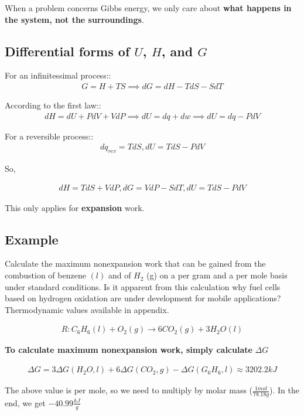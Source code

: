 \documentclass[12pt]{book}
\begin{document}
When a problem concerns Gibbs energy, we only care about \textbf{what happens in the system, not the surroundings}.

\subsection*{Differential forms of $U$, $H$, and $G$}
For an infinitessimal process::
\begin{align*}
    G=H+TS\implies dG=dH-TdS-SdT
\end{align*}

According to the first law::
\begin{align*}
    dH=dU+PdV+VdP\implies dU=dq+dw\implies dU=dq-PdV
\end{align*}

For a reversible process::
\begin{align*}
    dq_{rev}=TdS, dU=TdS-PdV
\end{align*}

So,

\begin{align*}
    dH=TdS+VdP,dG=VdP-SdT, dU=TdS-PdV
\end{align*}

This only applies for \textbf{expansion} work.

\subsection*{Example}

Calculate the maximum nonexpansion work that can be gained from the combustion of
benzene $(l)$ and of $H_2$ (g) on a per gram and a per mole basis under standard conditions. Is it
apparent from this calculation why fuel cells based on hydrogen oxidation are under
development for mobile applications? Thermodynamic values available in appendix.

\begin{align*}
    R:C_6H_6(l)+O_2(g)\rightarrow 6CO_2(g)+3H_2O(l)
\end{align*}

\textbf{To calculate maximum nonexpansion work, simply calculate} $\Delta G$

\begin{align*}
    \Delta G=3\Delta G(H_2O,l)+6\Delta G(CO_2,g)-\Delta G(G_6H_6,l)\approx 3202.2kJ
\end{align*}

The above value is per mole, so we need to multiply by molar mass ($\frac{1mol}{78.18g}$). In the end, we get $-40.99 \frac{kJ}{g}$
\end{document}
